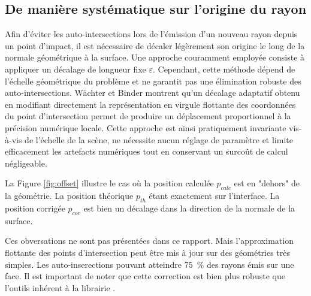 \subsection{De manière systématique sur l'origine du rayon}
Afin d'éviter les auto-intersections lors de l'émission d'un nouveau rayon depuis un point d'impact, il est nécessaire de décaler légèrement son origine le long de la normale géométrique à la surface. Une approche couramment employée consiste à appliquer un décalage de longueur fixe $\varepsilon$. Cependant, cette méthode dépend de l'échelle géométrique du problème et ne garantit pas une élimination robuste des auto-intersections. Wächter et Binder \cite{Wachter2019} montrent qu'un décalage adaptatif obtenu en modifiant directement la représentation en virgule flottante des coordonnées du point d'intersection permet de produire un déplacement proportionnel à la précision numérique locale. Cette approche est ainsi pratiquement invariante vis-à-vis de l'échelle de la scène, ne nécessite aucun réglage de paramètre et limite efficacement les artefacts numériques tout en conservant un surcoût de calcul négligeable.

La Figure \ref{fig:offset} illustre le cas où la position calculée $p_{calc}$ est en "dehors" de la géométrie. La position théorique $p_{th}$ étant exactement sur l'interface. La position corrigée $p_{cor}$ est bien un décalage dans la direction de la normale de la surface.

Ces obversations ne sont pas présentées dans ce rapport. Mais l'approximation flottante des points d'intersection peut être mis à jour sur des géométries très simples. Les auto-inserections pouvant atteindre $75$~\% des rayons émis sur une face. Il est important de noter que cette correction est bien plus robuste que l'outils inhérent à la librairie \emb.

